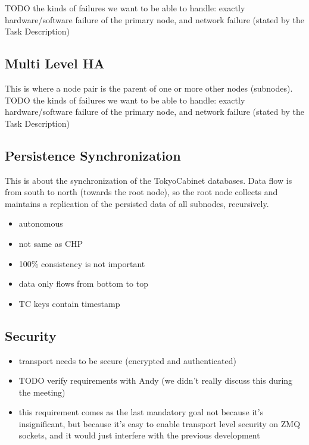 TODO the kinds of failures we want to be able to handle: exactly hardware/software failure of the primary node, and network failure (stated by the Task Description)\\


\subsection{Multi Level HA}
This is where a node pair is the parent of one or more other nodes (subnodes).\\

TODO the kinds of failures we want to be able to handle: exactly hardware/software failure of the primary node, and network failure (stated by the Task Description)\\

\subsection{Persistence Synchronization}
This is about the synchronization of the TokyoCabinet databases. Data flow is from south to north (towards the root node), so the root node collects and maintains a replication of the persisted data of all subnodes, recursively.

\begin{itemize}
	\item autonomous
	\item not same as CHP
	\item 100\% consistency is not important
	\item data only flows from bottom to top
	\item TC keys contain timestamp
\end{itemize}

\subsection{Security}
\begin{itemize}
	\item transport needs to be secure (encrypted and authenticated)
	\item TODO verify requirements with Andy (we didn't really discuss this during the meeting)
	\item this requirement comes as the last mandatory goal not because it's insignificant, but because it's easy to enable transport level security on ZMQ sockets, and it would just interfere with the previous development
\end{itemize}

